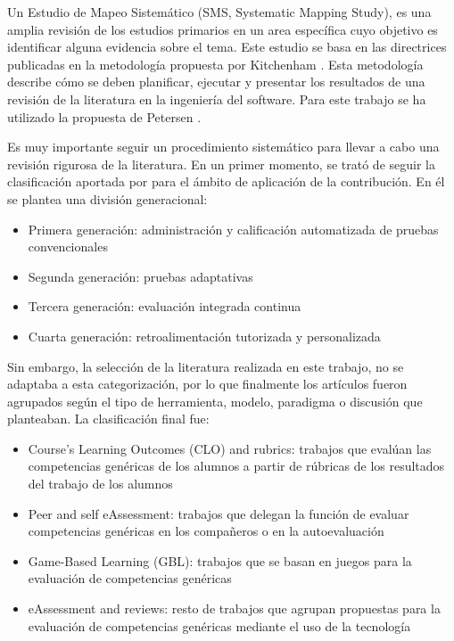 
Un Estudio de Mapeo Sistemático (SMS, Systematic Mapping Study), es una amplia revisión de los estudios primarios en un area específica cuyo objetivo es identificar alguna evidencia sobre el tema. Este estudio se basa en las directrices publicadas en la metodología propuesta por Kitchenham \cite{Kitchenham:2010}. Esta metodología describe cómo se deben planificar, ejecutar y presentar los resultados de una revisión de la literatura en la ingeniería del software. Para este trabajo se ha utilizado la propuesta de Petersen \cite{Petersen:2008}.

Es muy importante seguir un procedimiento sistemático para llevar a cabo una revisión rigurosa de la literatura. En un primer momento, se trató de seguir la clasificación aportada por \cite{Redecker:2012} para el ámbito de aplicación de la contribución. En él se plantea una división generacional:
\begin{itemize}
\item Primera generación: administración y calificación automatizada de pruebas convencionales
\item Segunda generación: pruebas adaptativas
\item Tercera generación: evaluación integrada continua
\item Cuarta generación: retroalimentación tutorizada y personalizada
\end{itemize}
Sin embargo, la selección de la literatura realizada en este trabajo, no se adaptaba a esta categorización, por lo que finalmente los artículos fueron agrupados según el tipo de herramienta, modelo, paradigma o discusión que planteaban. La clasificación final fue:
\begin{itemize}
\item Course’s Learning Outcomes (CLO) and rubrics: trabajos que evalúan las competencias genéricas de los alumnos a partir de rúbricas de los resultados del trabajo de los alumnos
\item Peer and self eAssessment: trabajos que delegan la función de evaluar competencias genéricas en los compañeros o en la autoevaluación
\item Game-Based Learning (GBL): trabajos que se basan en juegos para la evaluación de competencias genéricas
\item eAssessment and reviews: resto de trabajos que agrupan propuestas para la evaluación de competencias genéricas mediante el uso de la tecnología 
\end{itemize}

